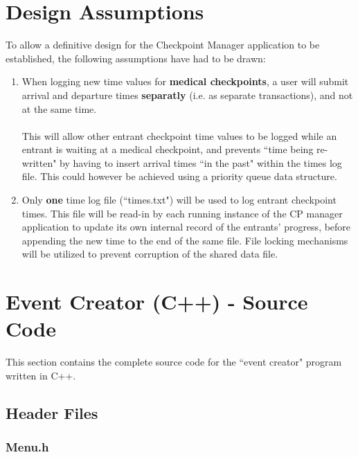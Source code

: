 \documentclass[a4paper, 10pt]{article}
\begin{document}
\section{Design Assumptions}

To allow a definitive design for the Checkpoint Manager application to be established, the following assumptions have had to be drawn:

\begin{enumerate}

\item When logging new time values for \textbf{medical checkpoints}, a user will submit arrival and departure times \textbf{separatly} (i.e. as separate transactions), and not at the same time. \\\\
This will allow other entrant checkpoint time values to be logged while an entrant is waiting at a medical checkpoint, and prevents ``time being re-written" by having to insert arrival times ``in the past" within the times log file. This could however be achieved using a priority queue data structure.

\item Only \textbf{one} time log file (``times.txt") will be used to log entrant checkpoint times. This file will be read-in by each running instance of the CP manager application to update its own internal record of the entrants' progress, before appending the new time to the end of the same file. File locking mechanisms will be utilized to prevent corruption of the shared data file. 

\end{enumerate}



\clearpage

\section{Event Creator (C++) - Source Code}

This section contains the complete source code for the ``event creator" program written in C++.

\subsection{Header Files}

\subsubsection{Menu.h}

\end{document}
